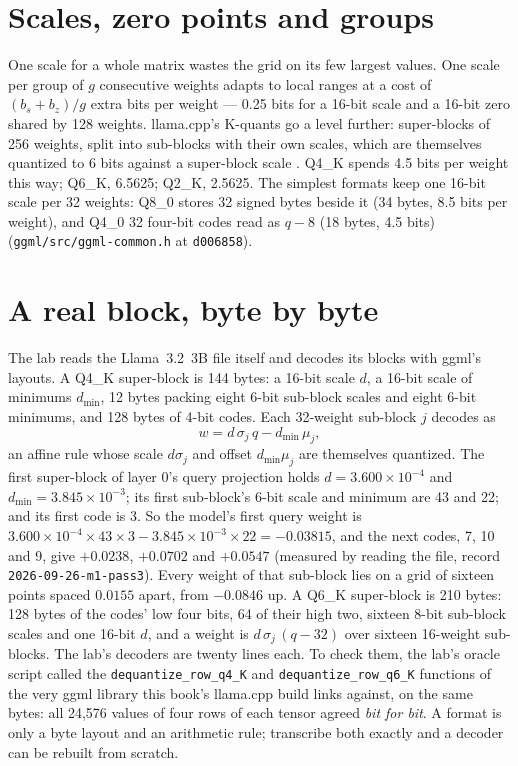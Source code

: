 \section{Scales, zero points and groups}

One scale for a whole matrix wastes the grid on its few largest values. One
scale per group of $g$ consecutive weights adapts to local ranges at a cost of
$(b_s+b_z)/g$ extra bits per weight --- 0.25 bits for a 16-bit scale and a
16-bit zero shared by 128 weights. llama.cpp's K-quants go a level further:
super-blocks of 256 weights, split into sub-blocks with their own scales, which
are themselves quantized to 6 bits against a super-block scale
\cite{kawrakow2023kquants}. Q4\_K spends 4.5 bits per weight this way; Q6\_K,
6.5625; Q2\_K, 2.5625. The simplest formats keep one 16-bit scale per 32
weights: Q8\_0 stores 32 signed bytes beside it (34 bytes, 8.5 bits per weight),
and Q4\_0 32 four-bit codes read as $q - 8$ (18 bytes, 4.5 bits)
(\texttt{ggml/src/ggml-common.h} at \texttt{d006858}).

\section{A real block, byte by byte}

The lab reads the Llama~3.2~3B file itself and decodes its blocks with ggml's
layouts. A Q4\_K super-block is 144 bytes: a 16-bit scale $d$, a 16-bit scale of
minimums $d_{\min}$, 12 bytes packing eight 6-bit sub-block scales and eight
6-bit minimums, and 128 bytes of 4-bit codes. Each 32-weight sub-block $j$
decodes as
\begin{equation}
w = d\,\sigma_j\,q - d_{\min}\,\mu_j ,
\label{eq:q4k}
\end{equation}
an affine rule whose scale $d\sigma_j$ and offset $d_{\min}\mu_j$ are themselves
quantized. The first super-block of layer 0's query projection holds
$d = 3.600 \times 10^{-4}$ and $d_{\min} = 3.845 \times 10^{-3}$; its first
sub-block's 6-bit scale and minimum are 43 and 22; and its first code is 3. So
the model's first query weight is
$3.600\times10^{-4} \times 43 \times 3 - 3.845\times10^{-3} \times 22 = -0.03815$,
and the next codes, 7, 10 and 9, give $+0.0238$, $+0.0702$ and $+0.0547$
(measured by reading the file, record \texttt{2026-09-26-m1-pass3}). Every weight
of that sub-block lies on a grid of sixteen points spaced $0.0155$ apart, from
$-0.0846$ up. A Q6\_K super-block is 210 bytes: 128 bytes of the codes' low four
bits, 64 of their high two, sixteen 8-bit sub-block scales and one 16-bit $d$,
and a weight is $d\,\sigma_j\,(q - 32)$ over sixteen 16-weight sub-blocks. The
lab's decoders are twenty lines each. To check them, the lab's oracle script
called the \texttt{dequantize\_row\_q4\_K} and \texttt{dequantize\_row\_q6\_K}
functions of the very ggml library this book's llama.cpp build links against,
on the same bytes: all 24,576 values of four rows of each tensor agreed \emph{bit
for bit}. A format is only a byte layout and an arithmetic rule; transcribe
both exactly and a decoder can be rebuilt from scratch.

